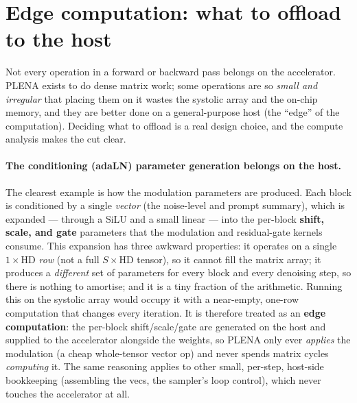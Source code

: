 \documentclass[11pt]{report}
\begin{document}
\section{Edge computation: what to offload to the host}
\label{sec:edge}

Not every operation in a forward or backward pass belongs on the
accelerator. PLENA exists to do dense matrix work; some operations are so
\emph{small and irregular} that placing them on it wastes the systolic array
and the on-chip memory, and they are better done on a general-purpose host
(the ``edge'' of the computation). Deciding what to offload is a real design
choice, and the compute analysis makes the cut clear.

\paragraph{The conditioning (adaLN) parameter generation belongs on the
host.} The clearest example is how the modulation parameters are produced.
Each block is conditioned by a single \emph{vector} (the noise-level and
prompt summary), which is expanded --- through a SiLU and a small linear ---
into the per-block \textbf{shift, scale, and gate} parameters that the
modulation and residual-gate kernels consume. This expansion has three
awkward properties: it operates on a single $1\times\text{HD}$ \emph{row}
(not a full $S\times\text{HD}$ tensor), so it cannot fill the matrix array;
it produces a \emph{different} set of parameters for every block and every
denoising step, so there is nothing to amortise; and it is a tiny fraction of
the arithmetic. Running this on the systolic array would occupy it with a
near-empty, one-row computation that changes every iteration. It is therefore
treated as an \textbf{edge computation}: the per-block shift/scale/gate are
generated on the host and supplied to the accelerator alongside the weights,
so PLENA only ever \emph{applies} the modulation (a cheap whole-tensor vector
op) and never spends matrix cycles \emph{computing} it. The same reasoning
applies to other small, per-step, host-side bookkeeping (assembling the vecs,
the sampler's loop control), which never touches the accelerator at all.
\end{document}
